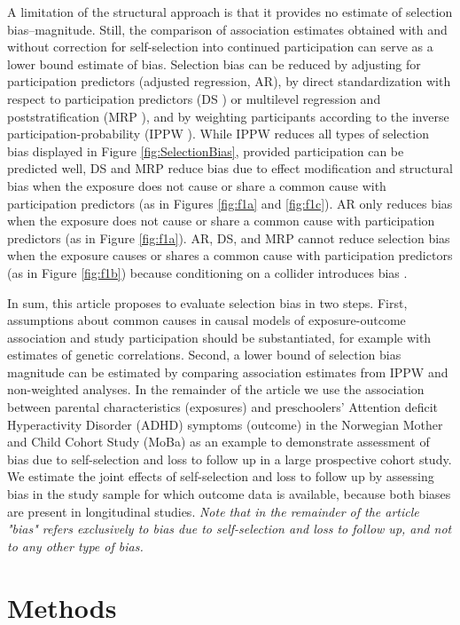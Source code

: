 \documentclass[12pt]{article}
\begin{document}
A limitation of the structural approach is that it provides no estimate of selection bias--magnitude. Still, the comparison of association estimates obtained with and without correction for self-selection into continued participation can serve as a lower bound estimate of bias. Selection bias can be reduced by adjusting for participation predictors (adjusted regression, AR), by direct standardization with respect to participation predictors (DS \cite{Miettinen1972-vf}) or multilevel regression and poststratification (MRP \cite{Downes2018-oa}), and by weighting participants according to the inverse participation-probability (IPPW \cite{Seaman2013-rj}). While IPPW reduces all types of selection bias displayed in Figure \ref{fig:SelectionBias}, provided participation can be predicted well, DS and MRP reduce bias due to effect modification and structural bias when the exposure does not cause or share a common cause with participation predictors (as in Figures \ref{fig:f1a} and \ref{fig:f1c}). AR only reduces bias when the exposure does not cause or share a common cause with participation predictors (as in Figure \ref{fig:f1a}). AR, DS, and MRP cannot reduce selection bias when the exposure causes or shares a common cause with participation predictors (as in Figure \ref{fig:f1b}) because conditioning on a collider introduces bias \cite{Cole2010-za}.

In sum, this article proposes to evaluate selection bias in two steps. First, assumptions about common causes in causal models of exposure-outcome association and study participation should be substantiated, for example with estimates of genetic correlations. Second, a lower bound of selection bias magnitude can be estimated by comparing association estimates from IPPW and non-weighted analyses. In the remainder of the article we use the association between parental characteristics (exposures) and preschoolers' Attention deficit Hyperactivity Disorder (ADHD) symptoms (outcome) in the Norwegian Mother and Child Cohort Study (MoBa) as an example to demonstrate assessment of bias due to self-selection and loss to follow up in a large prospective cohort study. We estimate the joint effects of self-selection and loss to follow up by assessing bias in the study sample for which outcome data is available, because both biases are present in longitudinal studies. \emph{Note that in the remainder of the article "bias" refers exclusively to bias due to self-selection and loss to follow up, and not to any other type of bias.}

\section{Methods}
\end{document}
